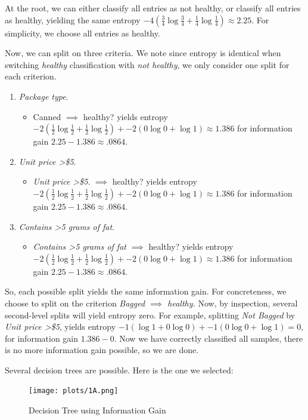 \begin{solution}
At the root, we can either classify all entries as not healthy, or classify all entries as healthy, yielding the same entropy $-4\left( \frac{3}{4} \log{\frac{3}{4}} + \frac{1}{4} \log{\frac{1}{4}}\right) \approx 2.25$. For simplicity, we choose all entries as healthy.

Now, we can split on three criteria. We note since entropy is identical when switching \emph{healthy} classification with \emph{not healthy}, we only consider one split for each criterion.
\begin{enumerate}
\item \emph{Package type}.
\begin{itemize}
\item Canned $\implies$ healthy? yields entropy $-2\left( \frac{1}{2} \log{\frac{1}{2}} + \frac{1}{2} \log{\frac{1}{2}}\right) + -2\left( 0 \log{0} + \log{1}\right) \approx 1.386$ for information gain $2.25 - 1.386 \approx .0864$.
\end{itemize}

\item \emph{Unit price \textgreater \$5}.
\begin{itemize}
\item \emph{Unit price \textgreater \$5}. $\implies$ healthy? yields entropy $-2\left( \frac{1}{2} \log{\frac{1}{2}} + \frac{1}{2} \log{\frac{1}{2}}\right) + -2\left( 0 \log{0} + \log{1}\right) \approx 1.386$ for information gain $2.25 - 1.386 \approx .0864$.
\end{itemize}

\item \emph{Contains \textgreater 5 grams of fat}.
\begin{itemize}
\item \emph{Contains \textgreater 5 grams of fat} $\implies$ healthy? yields entropy $-2\left( \frac{1}{2} \log{\frac{1}{2}} + \frac{1}{2} \log{\frac{1}{2}}\right) + -2\left( 0 \log{0} + \log{1}\right) \approx 1.386$ for information gain $2.25 - 1.386 \approx .0864$.
\end{itemize}
\end{enumerate}
So, each possible split yields the same information gain. For concreteness, we choose to split on the criterion \emph{Bagged $\implies$ healthy.} Now, by inspection, several second-level splits will yield entropy zero. For example, splitting \emph{Not Bagged }by \emph{Unit price \textgreater \$5}, yields entropy $-1(\log 1 + 0 \log 0) + -1(0 \log 0 + \log 1) = 0$, for information gain $1.386 - 0$. Now we have correctly classified all samples, there is no more information gain possible, so we are done.

Several decision trees are possible. Here is the one we selected:
\begin{figure}[H]
    \begin{center}
    \texttt{[image: plots/1A.png]}
    \caption{Decision Tree using Information Gain}
    \end{center}
    \end{figure}

\end{solution}

